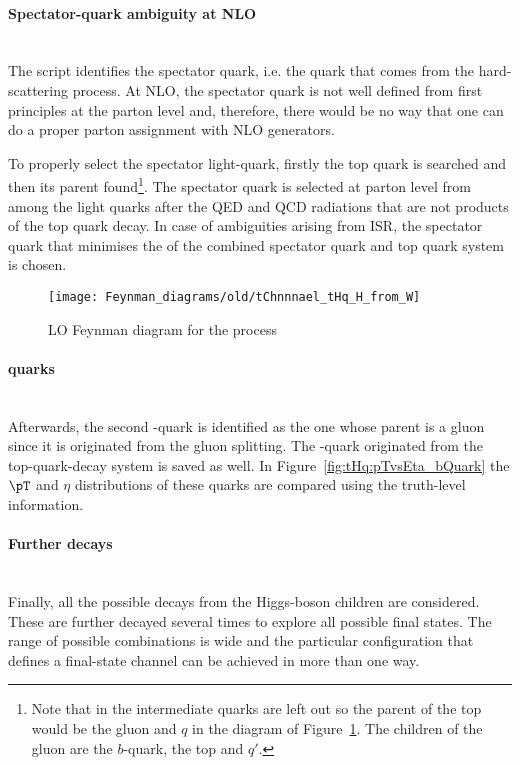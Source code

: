 \paragraph{Spectator-quark ambiguity at NLO}\mbox{}\\
The script identifies the
spectator quark, i.e. the quark that comes from the hard-scattering process.
At NLO, the spectator quark is not well defined from first principles at the parton level 
and, therefore, there would be no way that one can do a proper parton assignment with NLO generators.

To properly select the spectator light-quark, firstly the top quark is searched and then its parent found\footnote{%
Note that in \PYTHIA the intermediate quarks are left out so the parent of the top would be the gluon and $q$ in the 
diagram of Figure~\ref{fig:tHq:TruthFeyman:HfromW}.
The children of the gluon are the $b$-quark, the top and $q'$.}. 
The spectator quark is selected at parton level from among the light quarks after 
the QED and QCD radiations that are not products of the top quark decay. 
In case of ambiguities arising from ISR, the spectator quark that minimises the \pT of 
the combined spectator quark and top quark system is chosen.

\begin{figure}[htbp!]
\centering
\texttt{[image: Feynman\_diagrams/old/tChnnnael\_tHq\_H\_from\_W]}
\caption{LO Feynman diagram for the \tHq process}
\label{fig:tHq:TruthFeyman:HfromW}
\end{figure}

\paragraph{\Pbottom quarks}\mbox{}\\
 Afterwards, the second \Pbottom-quark is identified as the one whose parent
 is a gluon since it is originated from the gluon splitting. The \Pbottom-quark originated 
 from the top-quark-decay system is saved as well. In Figure~\ref{fig:tHq:pTvsEta_bQuark}
 the $\pT$ and $\eta$ distributions of these quarks are compared using the truth-level
 information.
 
 
\paragraph{Further decays}\mbox{}\\
Finally, all the possible decays from the Higgs-boson children are considered.
These are further decayed several times to explore all possible final states. %
The range of possible combinations is wide and the particular configuration that defines
a final-state channel can be achieved in more than one way. 

